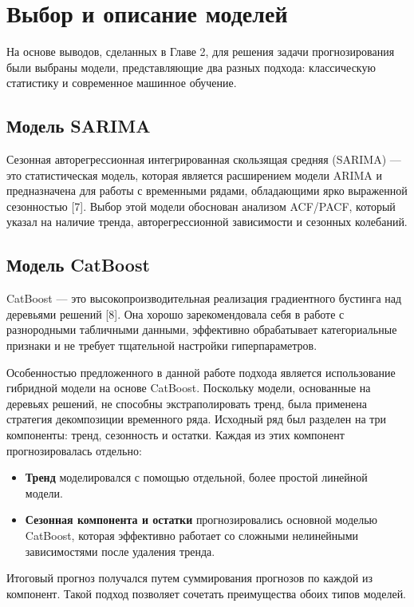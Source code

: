 \section{Выбор и описание моделей}
\label{sec:model_selection}

На основе выводов, сделанных в Главе 2, для решения задачи прогнозирования были выбраны модели, представляющие два разных подхода: классическую статистику и современное машинное обучение.

\subsection{Модель SARIMA}
Сезонная авторегрессионная интегрированная скользящая средняя (SARIMA) — это статистическая модель, которая является расширением модели ARIMA и предназначена для работы с временными рядами, обладающими ярко выраженной сезонностью [7]. Выбор этой модели обоснован анализом ACF/PACF, который указал на наличие тренда, авторегрессионной зависимости и сезонных колебаний.

\subsection{Модель CatBoost}
CatBoost — это высокопроизводительная реализация градиентного бустинга над деревьями решений [8]. Она хорошо зарекомендовала себя в работе с разнородными табличными данными, эффективно обрабатывает категориальные признаки и не требует тщательной настройки гиперпараметров.

Особенностью предложенного в данной работе подхода является использование гибридной модели на основе CatBoost. Поскольку модели, основанные на деревьях решений, не способны экстраполировать тренд, была применена стратегия декомпозиции временного ряда. Исходный ряд был разделен на три компоненты: тренд, сезонность и остатки. Каждая из этих компонент прогнозировалась отдельно:
\begin{itemize}
    \item \textbf{Тренд} моделировался с помощью отдельной, более простой линейной модели.
    \item \textbf{Сезонная компонента и остатки} прогнозировались основной моделью CatBoost, которая эффективно работает со сложными нелинейными зависимостями после удаления тренда.
\end{itemize}
Итоговый прогноз получался путем суммирования прогнозов по каждой из компонент. Такой подход позволяет сочетать преимущества обоих типов моделей.

